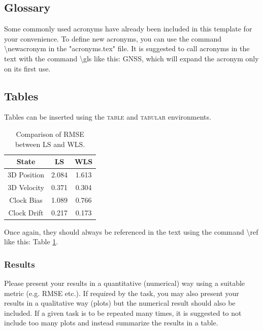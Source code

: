 \subsection{Glossary}
Some commonly used acronyms have already been included in this template for your convenience. To define new acronyms, you can use the command \textbackslash newacronym in the "acronyms.tex" file. It is suggested to call acronyms in the text with the command \textbackslash gls like this: \gls{GNSS}, which will expand the acronym only on its first use. 
%
\subsection{Tables}
Tables can be inserted using the \textsc{table} and \textsc{tabular} environments.
%
\begin{table}[ht]
    \centering
    \begin{tabular}{c c c} 
        \toprule
        \textbf{State} & \textbf{LS} & \textbf{WLS} \\ 
        \midrule
        3D Position & 2.084 & 1.613 \\ 
        3D Velocity & 0.371 & 0.304 \\ 
        Clock Bias & 1.089 & 0.766 \\
        Clock Drift & 0.217 & 0.173 \\
        \bottomrule
    \end{tabular}
    \caption{Comparison of \gls{RMSE} between \gls{LS} and \gls{WLS}.}
    \label{tab:values}
\end{table} 
%
Once again, they should always be referenced in the text using the command \textbackslash ref like this: Table \ref{tab:values}.
%
\subsubsection{Results}
Please present your results in a quantitative (numerical) way using a suitable metric (e.g. \gls{RMSE} etc.). If required by the task, you may also present your results in a qualitative way (plots) but the numerical result should also be included. If a given task is to be repeated many times, it is suggested to not include too many plots and instead summarize the results in a table.
%